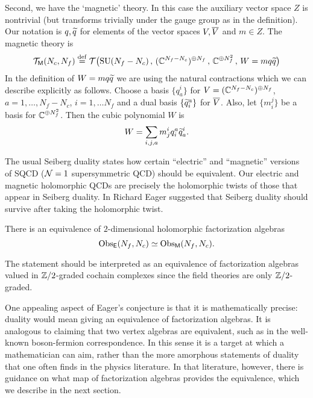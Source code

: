 \documentclass[11pt]{amsart}
\def\SU{{\rm SU}}
\begin{document}
Second, we have the `magnetic' theory. 
In this case the auxiliary vector space $Z$ is nontrivial (but transforms trivially under the gauge group as in the definition). 
Our notation is $q,\Tilde{q}$ for elements of the vector spaces $V, \Bar{V}$ and $m\in Z$.
The magnetic theory is
\[
\cT_{\sfM} (N_c, N_f) \define \cT\big(\SU(N_f - N_c) \, , \, (\CC^{N_f - N_c})^{\oplus N_f} \, , \, \CC^{\oplus N^2_f} \, , \, W = m q \Tilde{q} \big)
\]
In the definition of $W = m q \Tilde{q}$ we are using the natural contractions which we can describe explicitly as follows.
Choose a basis $\{q_a^i\}$ for $V = (\CC^{N_f - N_c})^{\oplus N_f}$, $a = 1,\ldots, N_f - N_c$, $i=1,\ldots N_f$ and a dual basis $\{\Tilde{q}_i^a\}$ for $\Bar{V}$.
Also, let $\{m_i^j\}$ be a basis for $\CC^{\oplus N_f^2}$. 
Then the cubic polynomial $W$ is
\[
W = \sum_{i,j,a} m^i_j q_i^a \Tilde{q}^i_a .
\]

The usual Seiberg duality states how certain ``electric'' and ``magnetic'' versions of SQCD ($\cN=1$ supersymmetric QCD) should be equivalent.
Our electric and magnetic holomorphic QCDs are precisely the holomorphic twists of those that appear in Seiberg duality.
In \cite{Eager} Richard Eager suggested that Seiberg duality should survive after taking the holomorphic twist.

\begin{conj}
There is an equivalence of $2$-dimensional holomorphic factorization algebras
\[
\Obs_{\sfE}(N_f, N_c) \simeq \Obs_{\sfM} (N_f, N_c)  .
\]
\end{conj}

The statement should be interpreted as an equivalence of factorization algebras valued in $\ZZ/2$-graded cochain complexes since the field theories are only $\ZZ/2$-graded.

One appealing aspect of Eager's conjecture is that it is mathematically precise:
duality would mean giving an equivalence of factorization algebras.
It is analogous to claiming that two vertex algebras are equivalent,
such as in the well-known boson-fermion correspondence.
In this sense it is a target at which a mathematician can aim,
rather than the more amorphous statements of duality that one often finds in the physics literature.
In that literature, however, there is guidance on what map of factorization algebras provides the equivalence,
which we describe in the next section.
\end{document}
